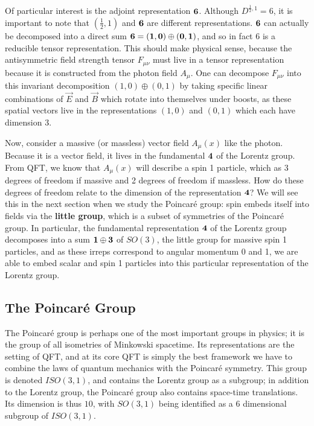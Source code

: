 \documentclass[11pt, oneside]{article}   	%
\theoremstyle{definition}
\begin{document}
Of particular interest is the adjoint representation $\bf 6$. Although $D^{\frac{1}{2}, 1} = 6$, it is important to note that 
$(\frac{1}{2}, 1)$ and $\bf 6$ are different representations. $\bf 6$ can actually be decomposed into a direct sum $\bf 6 = (1, 
0)\oplus (0, 1)$, and so in fact $6$ is a reducible tensor representation. This should make physical sense, because the 
antisymmetric field strength tensor $F_{\mu\nu}$ must live in a tensor representation because it is constructed from the 
photon field $A_\mu$. One can decompose $F_{\mu\nu}$ into this invariant decomposition $(1, 0)\oplus (0, 1)$ by 
taking specific linear combinations of $\vec E$ and $\vec B$ which rotate into themselves under boosts, as these spatial 
vectors live in the representations $(1, 0)$ and $(0, 1)$ which each have dimension 3. 

Now, consider a massive (or massless) vector field $A_\mu(x)$ like the photon. Because it is a vector field, it lives in the 
fundamental $\bf 4$ of the Lorentz group. From QFT, we know that $A_\mu(x)$ will describe a spin 1 particle, which as 3 
degrees of freedom if massive and 2 degrees of freedom if massless. How do these degrees of freedom relate to the 
dimension of the representation $\bf 4$? We will see this in the next section when we study the Poincar\'e group: spin 
embeds itself into fields via the \textbf{little group}, which is a subset of symmetries of the Poincar\'e group. In particular, the 
fundamental representation $\bf 4$ of the Lorentz group decomposes into a sum $\bf 1\oplus 3$ of $SO(3)$, the little group 
for massive spin 1 particles, and as these irreps correspond to angular momentum 0 and 1, we are able to embed scalar and 
spin 1 particles into this particular representation of the Lorentz group. 
 

\subsection{The Poincar\'{e} Group}

The Poincar\'e group is perhaps one of the most important groups in physics; it is the group of all isometries of Minkowski 
spacetime. Its representations are the setting of QFT, and at its core QFT is simply the best framework we have to combine 
the laws of quantum mechanics with the Poincar\'e symmetry. This group is denoted $ISO(3, 1)$, and contains the 
Lorentz group as a subgroup; in addition to the Lorentz group, the Poincar\'e group also contains space-time translations. 
Its dimension is thus $10$, with $SO(3, 1)$ being identified as a 6 dimensional subgroup of $ISO(3, 1)$. 
\end{document}
